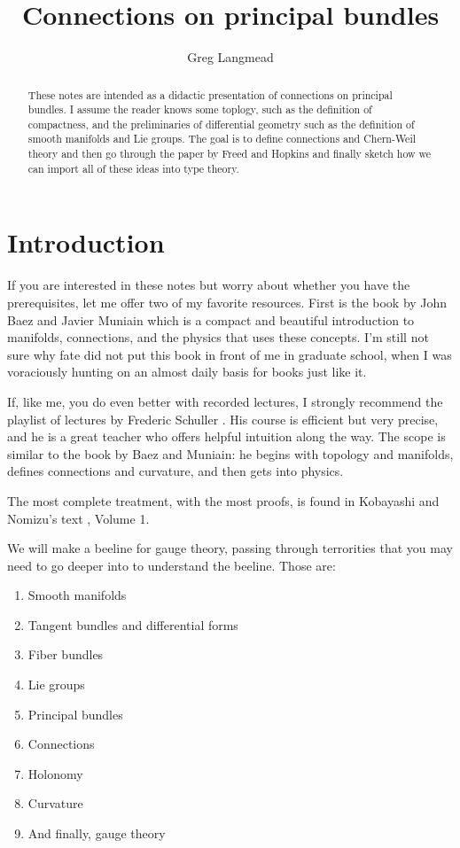 \documentclass[12pt]{article}
\title{Connections on principal bundles}
\author{Greg Langmead}
\begin{document}
\maketitle
\begin{abstract}
These notes are intended as a didactic presentation of connections on principal bundles. I assume the reader knows some toplogy, such as the definition of compactness, and the preliminaries of differential geometry such as the definition of smooth manifolds and Lie groups. The goal is to define connections and Chern-Weil theory and then go through the paper by Freed and Hopkins \cite{freed2013chernweil} and finally sketch how we can import all of these ideas into type theory.
\end{abstract}
\section{Introduction}
If you are interested in these notes but worry about whether you have the prerequisites, let me offer two of my favorite resources. First is the book by John Baez and Javier Muniain \cite{baez1994gauge} which is a compact and beautiful introduction to manifolds, connections, and the physics that uses these concepts. I'm still not sure why fate did not put this book in front of me in graduate school, when I was voraciously hunting on an almost daily basis for books just like it.

If, like me, you do even better with recorded lectures, I strongly recommend the playlist of lectures by Frederic Schuller \cite{schullerYoutube2015}. His course is efficient but very precise, and he is a great teacher who offers helpful intuition along the way. The scope is similar to the book by Baez and Muniain: he begins with topology and manifolds, defines connections and curvature, and then gets into physics.

The most complete treatment, with the most proofs, is found in Kobayashi and Nomizu's text \cite{kobayashinomizu}, Volume 1.

We will make a beeline for gauge theory, passing through terrorities that you may need to go deeper into to understand the beeline. Those are:
\begin{enumerate}
    \item Smooth manifolds
    \item Tangent bundles and differential forms
    \item Fiber bundles
    \item Lie groups
    \item Principal bundles
    \item Connections
    \item Holonomy
    \item Curvature
    \item And finally, gauge theory
\end{enumerate}
\end{document}
